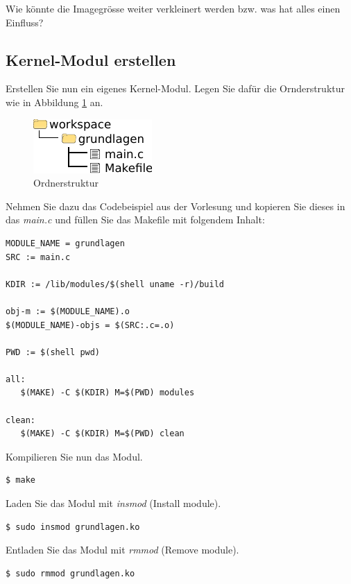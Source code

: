 Wie könnte die Imagegrösse weiter verkleinert werden bzw. was hat alles einen Einfluss?

\underline{\hspace{\textwidth}}


\subsection{Kernel-Modul erstellen}

Erstellen Sie nun ein eigenes Kernel-Modul. Legen Sie dafür die Ornderstruktur
wie in Abbildung \ref{fig:basic_dirs} an.
\clearpage

\begin{figure}[h!]
   \begin{center}
      \includegraphics{images/basic_dirs}
   \end{center}
   \caption{Ordnerstruktur}
   \label{fig:basic_dirs}
\end{figure}

Nehmen Sie dazu das Codebeispiel aus der Vorlesung und kopieren Sie
dieses in das \emph{main.c} und füllen Sie das Makefile mit folgendem Inhalt:

\begin{lstlisting}[caption=Makefile]
MODULE_NAME = grundlagen
SRC := main.c

KDIR := /lib/modules/$(shell uname -r)/build

obj-m := $(MODULE_NAME).o
$(MODULE_NAME)-objs = $(SRC:.c=.o)

PWD := $(shell pwd)

all:
   $(MAKE) -C $(KDIR) M=$(PWD) modules

clean:
   $(MAKE) -C $(KDIR) M=$(PWD) clean

\end{lstlisting}

Kompilieren Sie nun das Modul.
\begin{lstlisting}
$ make
\end{lstlisting}

Laden Sie das Modul mit \emph{insmod} (Install module).
\begin{lstlisting}
$ sudo insmod grundlagen.ko
\end{lstlisting}

Entladen Sie das Modul mit \emph{rmmod} (Remove module).
\begin{lstlisting}
$ sudo rmmod grundlagen.ko
\end{lstlisting}

